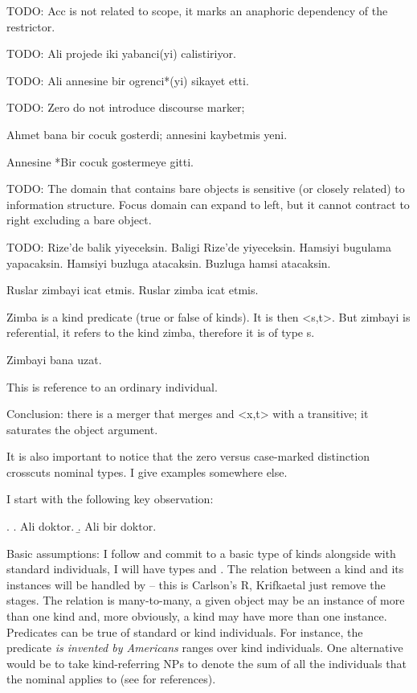 \documentclass[11pt,a4paper]{article}
\begin{document}
TODO: Acc is not related to scope, it marks an anaphoric dependency of the restrictor.

TODO: Ali projede iki yabanci(yi) calistiriyor.

TODO: Ali annesine bir ogrenci*(yi) sikayet etti.

TODO: Zero do not introduce discourse marker;

Ahmet bana bir cocuk gosterdi; annesini kaybetmis yeni. 

Annesine *Bir cocuk gostermeye gitti.

TODO: The domain that contains bare objects is sensitive (or closely related) to information structure. Focus domain can expand to left, but it cannot contract to right excluding a bare object.

TODO: 
Rize'de balik yiyeceksin.
Baligi Rize'de yiyeceksin. 
Hamsiyi bugulama yapacaksin.
Hamsiyi buzluga atacaksin. 
Buzluga hamsi atacaksin.

Ruslar zimbayi icat etmis.
Ruslar zimba icat etmis.

Zimba is a kind predicate (true or false of kinds). It is then <s,t>. But zimbayi is referential, it refers to the kind zimba, therefore it is of type s.

Zimbayi bana uzat.

This is reference to an ordinary individual.

Conclusion: there is a merger that merges and <x,t> with a transitive; it saturates the object argument.


It is also important to notice that the zero versus case-marked distinction crosscuts nominal types. I give examples somewhere else.

I start with the following key observation:

\ex.\label{ex:doktor} 
\a. Ali doktor.
\b. Ali bir doktor.

Basic assumptions: I follow \cite[p.\ 64]{krifkaetal95} and commit to a basic type of kinds alongside with standard individuals, I will have types  and . The relation between a kind and its instances will be handled by  -- this is Carlson's R, Krifkaetal just remove the stages. The relation is many-to-many, a given object may be an instance of more than one kind and, more obviously, a kind may have more than one instance. Predicates can be true of standard or kind individuals. For instance, the predicate \textit{is invented by Americans} ranges over kind individuals. One alternative would be to take kind-referring NPs to denote the sum of all the individuals that the nominal applies to (see \cite{krifkaetal95} for references).
\end{document}
